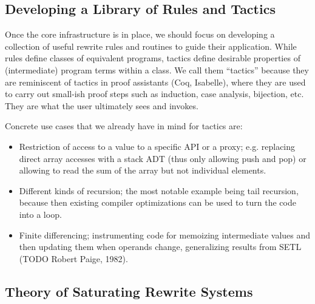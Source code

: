 \subsection{Developing a Library of Rules and Tactics}

Once the core infrastructure is in place, we should focus on developing
a collection of useful rewrite rules and routines to guide their application.
While rules define classes of equivalent programs, tactics define desirable
properties of (intermediate) program terms within a class.
We call them ``tactics'' because they are reminiscent of tactics in proof
assistants (Coq, Isabelle), where they are used to carry out
small-ish proof steps such as induction, case analysis, bijection, etc.
They are what the user ultimately sees and invokes.

Concrete use cases that we already have in mind for tactics are:

\begin{itemize}
  \item Restriction of access to a value to a specific API or a proxy;
    e.g. replacing direct array accesses with a stack ADT (thus only allowing push and pop)
    or allowing to read the sum of the array but not individual elements.
  \item Different kinds of recursion; the most notable example being
    tail recursion, because then existing compiler optimizations can be
    used to turn the code into a loop.
  \item Finite differencing; instrumenting code for memoizing intermediate
    values and then updating them when operands change, generalizing results
    from SETL (TODO Robert Paige, 1982).
\end{itemize}

\subsection{Theory of Saturating Rewrite Systems}

